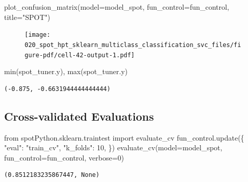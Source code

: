\documentclass[
  letterpaper,
  DIV=11,
  numbers=noendperiod]{scrreprt}
\newenvironment{Shaded}{\begin{snugshade}}{\end{snugshade}}
\newcommand{\BuiltInTok}[1]{\textcolor[rgb]{0.00,0.23,0.31}{#1}}
\newcommand{\DecValTok}[1]{\textcolor[rgb]{0.68,0.00,0.00}{#1}}
\newcommand{\ImportTok}[1]{\textcolor[rgb]{0.00,0.46,0.62}{#1}}
\newcommand{\NormalTok}[1]{\textcolor[rgb]{0.00,0.23,0.31}{#1}}
\newcommand{\OperatorTok}[1]{\textcolor[rgb]{0.37,0.37,0.37}{#1}}
\newcommand{\StringTok}[1]{\textcolor[rgb]{0.13,0.47,0.30}{#1}}
\begin{document}
\begin{Shaded}
\begin{Highlighting}[]
\NormalTok{plot\_confusion\_matrix(model}\OperatorTok{=}\NormalTok{model\_spot, fun\_control}\OperatorTok{=}\NormalTok{fun\_control, title}\OperatorTok{=}\StringTok{"SPOT"}\NormalTok{)}
\end{Highlighting}
\end{Shaded}

\begin{figure}[H]

{\centering \texttt{[image: 020\_spot\_hpt\_sklearn\_multiclass\_classification\_svc\_files/figure-pdf/cell-42-output-1.pdf]}

}

\end{figure}

\begin{Shaded}
\begin{Highlighting}[]
\BuiltInTok{min}\NormalTok{(spot\_tuner.y), }\BuiltInTok{max}\NormalTok{(spot\_tuner.y)}
\end{Highlighting}
\end{Shaded}

\begin{verbatim}
(-0.875, -0.6631944444444444)
\end{verbatim}

\hypertarget{cross-validated-evaluations-2}{%
\subsection{Cross-validated
Evaluations}\label{cross-validated-evaluations-2}}

\begin{Shaded}
\begin{Highlighting}[]
\ImportTok{from}\NormalTok{ spotPython.sklearn.traintest }\ImportTok{import}\NormalTok{ evaluate\_cv}
\NormalTok{fun\_control.update(\{}
     \StringTok{"eval"}\NormalTok{: }\StringTok{"train\_cv"}\NormalTok{,}
     \StringTok{"k\_folds"}\NormalTok{: }\DecValTok{10}\NormalTok{,}
\NormalTok{\})}
\NormalTok{evaluate\_cv(model}\OperatorTok{=}\NormalTok{model\_spot, fun\_control}\OperatorTok{=}\NormalTok{fun\_control, verbose}\OperatorTok{=}\DecValTok{0}\NormalTok{)}
\end{Highlighting}
\end{Shaded}

\begin{verbatim}
(0.8512183235867447, None)
\end{verbatim}
\end{document}
